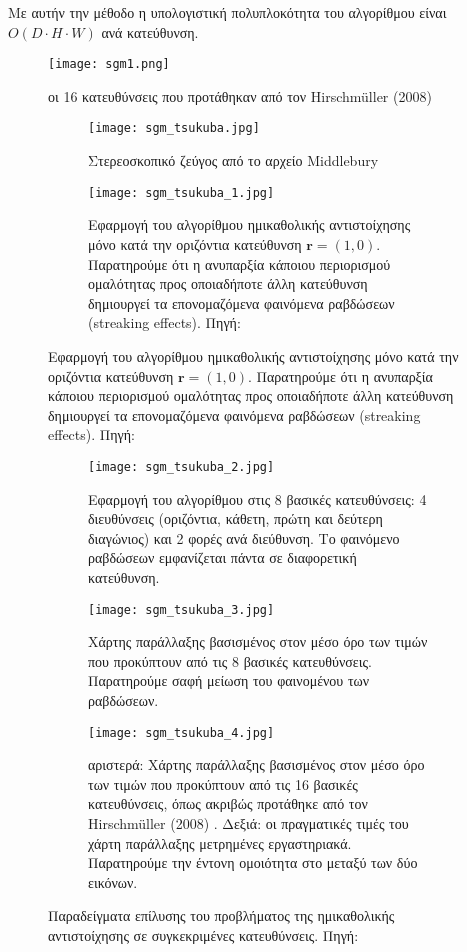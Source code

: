 Με αυτήν την μέθοδο η υπολογιστική πολυπλοκότητα του αλγορίθμου είναι $O(D\cdot H \cdot W)$ ανά κατεύθυνση.

\begin{figure}
	\centering
	\texttt{[image: sgm1.png]}
	\caption{οι 16 κατευθύνσεις που προτάθηκαν από τον \e Hirschmüller (2008) \g \citep{hirschmuller2008stereo}}
	\label{fig:sgm1}
\end{figure}

\begin{figure}
	\centering
	\begin{subfigure}{\textwidth}
		\texttt{[image: sgm\_tsukuba.jpg]}
		\caption{Στερεοσκοπικό ζεύγος από το αρχείο \e Middlebury \citep{scharstein2014high} \g}
		\label{fig:sgm_tsukuba}
	\end{subfigure}
	
	\begin{subfigure}{\textwidth}
		\texttt{[image: sgm\_tsukuba\_1.jpg]}
		\caption{Εφαρμογή του αλγορίθμου ημικαθολικής αντιστοίχησης μόνο κατά την οριζόντια κατεύθυνση $\textbf{r} = (1,0)$. Παρατηρούμε ότι η ανυπαρξία κάποιου περιορισμού ομαλότητας προς οποιαδήποτε άλλη κατεύθυνση δημιουργεί τα επονομαζόμενα φαινόμενα ραβδώσεων \e (streaking effects). \g Πηγή: \citep{SGMTutorial}}
		\label{fig:sgm_tsukuba_1}
	\end{subfigure}
\end{figure}

\begin{figure}	
	\begin{subfigure}{\textwidth}
		\texttt{[image: sgm\_tsukuba\_2.jpg]}
		\caption{Εφαρμογή του αλγορίθμου στις 8 βασικές κατευθύνσεις: 4 διευθύνσεις (οριζόντια, κάθετη, πρώτη και δεύτερη διαγώνιος) και 2 φορές ανά διεύθυνση. Το φαινόμενο ραβδώσεων εμφανίζεται πάντα σε διαφορετική κατεύθυνση.}
		\label{fig:sgm_tsukuba_2}
	\end{subfigure}
	
	\begin{subfigure}{\textwidth}
		\texttt{[image: sgm\_tsukuba\_3.jpg]}
		\caption{Χάρτης παράλλαξης βασισμένος στον μέσο όρο των τιμών που προκύπτουν από τις 8 βασικές κατευθύνσεις. Παρατηρούμε σαφή μείωση του φαινομένου των ραβδώσεων.}
		\label{fig:sgm_tsukuba_3}
	\end{subfigure}
	
	\begin{subfigure}{\textwidth}
		\texttt{[image: sgm\_tsukuba\_4.jpg]}
		\caption{αριστερά: Χάρτης παράλλαξης βασισμένος στον μέσο όρο των τιμών που προκύπτουν από τις 16 βασικές κατευθύνσεις, όπως ακριβώς προτάθηκε από τον \e Hirschmüller (2008) \g \citep{hirschmuller2008stereo}. Δεξιά: οι πραγματικές τιμές του χάρτη παράλλαξης μετρημένες εργαστηριακά. Παρατηρούμε την έντονη ομοιότητα στο μεταξύ των δύο εικόνων.}
		\label{fig:sgm_tsukuba_4}
	\end{subfigure}
	
	\caption{Παραδείγματα επίλυσης του προβλήματος της ημικαθολικής αντιστοίχησης σε συγκεκριμένες κατευθύνσεις.  Πηγή: \citep{SGMTutorial} }
	\label{fig:mean_filter_iterations}
\end{figure}

